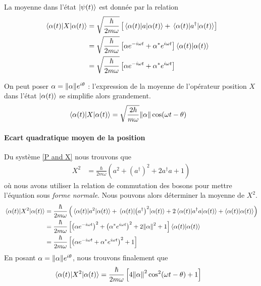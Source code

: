 \documentclass[11pt,oneside,a4paper]{article}
\newcommand{\h}{\ensuremath{\hbar}}
\begin{document}
La moyenne dans l'état $\ket{\psi(t)}$ est donnée par la relation
\begin{align}
  \expval{X}{{\alpha(t)}} &= \sqrt{\frac{\h}{2m\omega}}\left[\expval{a}{\alpha(t)}+\expval{a^\dagger}{\alpha(t)}\right]\\
  &= \sqrt{\frac{\h}{2m\omega}} \left[\alpha e^{-i\omega t}+\alpha^*e^{i\omega t}\right]\braket{\alpha(t)}\\
  &= \sqrt{\frac{\h}{2m\omega}} \left[\alpha e^{-i\omega t}+\alpha^*e^{i\omega t}\right]
\end{align}

On peut poser $\alpha = \norm{\alpha}e^{i\theta}$ : l'expression de la moyenne de l'opérateur position $X$ dans l'état $\ket{\alpha(t)}$ se simplifie alors grandement.
\begin{align}
  \label{mean position}
  \expval{X}{\alpha(t)} &= \sqrt{\frac{2\h}{m\omega}}\norm{\alpha}\cos(\omega t-\theta)
\end{align}

\paragraph{Ecart quadratique moyen de la position}

Du système \eqref{P and X} nous trouvons que 
\begin{align}
  X^2 &= \frac{\h}{2m\omega}\left(a^2+\left(a^\dagger\right)^2+2a^\dagger a+1\right)
\end{align}
où nous avons utiliser la relation de commutation des bosons pour mettre l'équation sous \emph{forme normale}. Nous pouvons alors déterminer la moyenne de $X^2$.
\begin{align}
  \expval{X^2}{\alpha(t)} &= \frac{\h}{2m\omega} \left(\expval{a^2}{\alpha(t)}+\expval{\left(a^\dagger\right)^2}{\alpha(t)}+2\expval{a^\dagger a}{\alpha(t)}+\braket{\alpha(t)}\right)\\
  &= \frac{\h}{2m\omega}\left[\left(\alpha e^{-i\omega t}\right)^2+\left(\alpha^*e^{i\omega t}\right)^2 +2\norm{\alpha}^2+1\right]\braket{\alpha(t)}\\
  &= \frac{\h}{2m\omega}\left[\left(\alpha e^{-i\omega t}+\alpha^*e^{i\omega t}\right)^2+1\right]\label{Mean X^2}
\end{align}
En posant $\alpha = \norm{\alpha}e^{i\theta}$, nous trouvons finalement que 
\begin{align}
  \expval{X^2}{\alpha(t)} &= \frac{\h}{2m\omega}\left[4\norm{\alpha}^2\cos^2(\omega t-\theta)+1\right]
\end{align}
\end{document}
